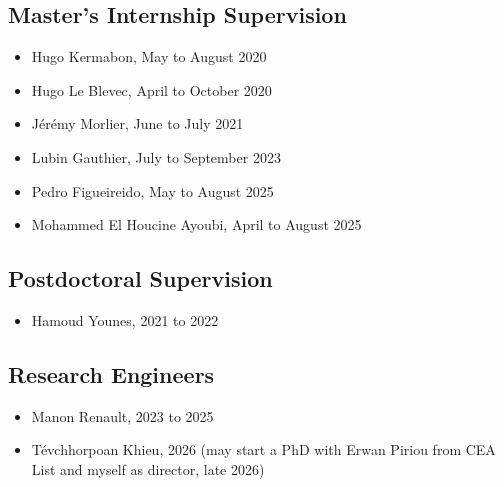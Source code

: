 \documentclass[11pt]{report}
\begin{document}
\subsection{Master's Internship Supervision}
\begin{itemize}
  \item Hugo Kermabon, May to August 2020
  \item Hugo Le Blevec, April to October 2020
  \item Jérémy Morlier, June to July 2021
  \item Lubin Gauthier, July to September 2023
  \item Pedro Figueireido, May to August 2025
  \item Mohammed El Houcine Ayoubi, April to August 2025
\end{itemize}
\subsection{Postdoctoral Supervision}
\begin{itemize}
  \item Hamoud Younes, 2021 to 2022
\end{itemize}
\subsection{Research Engineers}
\begin{itemize}
  \item Manon Renault, 2023 to 2025
  \item Tévchhorpoan Khieu, 2026 (may start a PhD with Erwan Piriou from CEA List and myself as director, late 2026)
\end{itemize}
\end{document}
